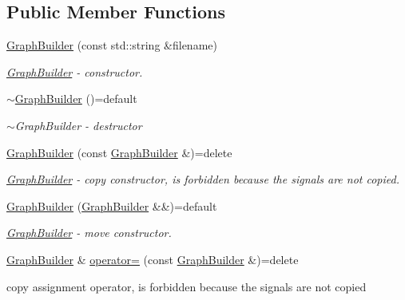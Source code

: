 \subsection*{Public Member Functions}
\begin{DoxyCompactItemize}
\item 
\hyperlink{a00007_af8e42b34ae946ec91a86daea07379bb4_af8e42b34ae946ec91a86daea07379bb4}{Graph\+Builder} (const std\+::string \&filename)
\begin{DoxyCompactList}\small\item\em \hyperlink{a00007}{Graph\+Builder} -\/ constructor. \end{DoxyCompactList}\item 
\hyperlink{a00007_a63770862e662bfa85ca917f2aa2085f7_a63770862e662bfa85ca917f2aa2085f7}{$\sim$\+Graph\+Builder} ()=default
\begin{DoxyCompactList}\small\item\em $\sim$\+Graph\+Builder -\/ destructor \end{DoxyCompactList}\item 
\hyperlink{a00007_a616bc8b7bcebcd695066b1c77bff0d58_a616bc8b7bcebcd695066b1c77bff0d58}{Graph\+Builder} (const \hyperlink{a00007}{Graph\+Builder} \&)=delete
\begin{DoxyCompactList}\small\item\em \hyperlink{a00007}{Graph\+Builder} -\/ copy constructor, is forbidden because the signals are not copied. \end{DoxyCompactList}\item 
\hyperlink{a00007_a63a7bf449c4341c57ac11292683fe4b5_a63a7bf449c4341c57ac11292683fe4b5}{Graph\+Builder} (\hyperlink{a00007}{Graph\+Builder} \&\&)=default
\begin{DoxyCompactList}\small\item\em \hyperlink{a00007}{Graph\+Builder} -\/ move constructor. \end{DoxyCompactList}\item 
\hyperlink{a00007}{Graph\+Builder} \& \hyperlink{a00007_ad25912e3925a0b5d272e439c133dbaed_ad25912e3925a0b5d272e439c133dbaed}{operator=} (const \hyperlink{a00007}{Graph\+Builder} \&)=delete
\begin{DoxyCompactList}\small\item\em 
\begin{DoxyItemize}
\item copy assignment operator, is forbidden because the signals are not copied 
\end{DoxyItemize}\end{DoxyCompactList}\item 

\end{DoxyCompactItemize}
